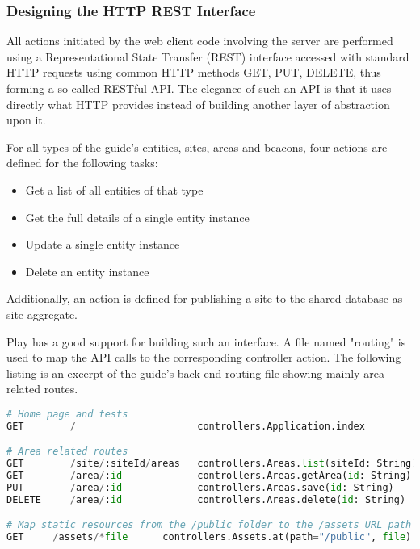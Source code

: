 \subsubsection{Designing the HTTP REST Interface}

All actions initiated by the web client code involving the server are performed using a Representational State Transfer (REST) interface accessed with standard HTTP requests using common HTTP methods GET, PUT, DELETE, thus forming a so called RESTful API. %
The elegance of such an API is that it uses directly what HTTP provides instead of building another layer of abstraction upon it.

For all types of the guide's entities, sites, areas and beacons, four actions are defined for the following tasks:

\begin{itemize}[noitemsep,nolistsep]
\item Get a list of all entities of that type
\item Get the full details of a single entity instance
\item Update a single entity instance
\item Delete an entity instance
\end{itemize}

Additionally, an action is defined for publishing a site to the shared database as site aggregate.

Play has a good support for building such an interface. A file named "routing" is used to map the API calls to the corresponding controller action. The following listing is an excerpt of the guide's back-end routing file showing mainly area related routes.

\begin{lstlisting}[caption={Excerpt from the routing file},basicstyle=\footnotesize\ttfamily,language=python,aboveskip=15pt]
# Home page and tests
GET        /                     controllers.Application.index

# Area related routes
GET        /site/:siteId/areas   controllers.Areas.list(siteId: String)
GET        /area/:id             controllers.Areas.getArea(id: String)
PUT        /area/:id             controllers.Areas.save(id: String)
DELETE     /area/:id             controllers.Areas.delete(id: String)

# Map static resources from the /public folder to the /assets URL path
GET     /assets/*file      controllers.Assets.at(path="/public", file)
\end{lstlisting}

